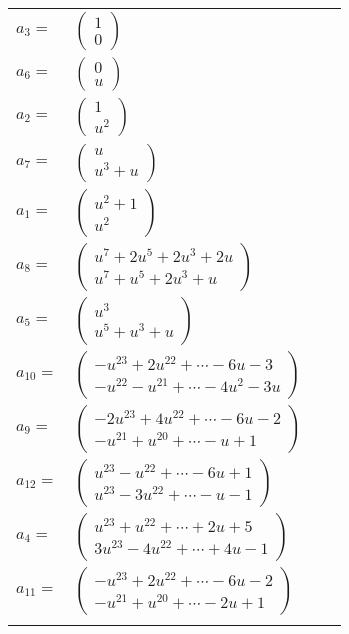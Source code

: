 \documentclass[1p]{elsarticle_modified}
\theoremstyle{definition}
\begin{document}
\begin{tabular}{m{7pt} m{180pt} m{7pt} m{180pt} }
\flushright $a_{3}=$&$\begin{pmatrix}1\\0\end{pmatrix}$ \\
\flushright $a_{6}=$&$\begin{pmatrix}0\\u\end{pmatrix}$ \\
\flushright $a_{2}=$&$\begin{pmatrix}1\\u^2\end{pmatrix}$ \\
\flushright $a_{7}=$&$\begin{pmatrix}u\\u^3+u\end{pmatrix}$ \\
\flushright $a_{1}=$&$\begin{pmatrix}u^2+1\\u^2\end{pmatrix}$ \\
\flushright $a_{8}=$&$\begin{pmatrix}u^7+2 u^5+2 u^3+2 u\\u^7+u^5+2 u^3+u\end{pmatrix}$ \\
\flushright $a_{5}=$&$\begin{pmatrix}u^3\\u^5+u^3+u\end{pmatrix}$ \\
\flushright $a_{10}=$&$\begin{pmatrix}- u^{23}+2 u^{22}+\cdots-6 u-3\\- u^{22}- u^{21}+\cdots-4 u^2-3 u\end{pmatrix}$ \\
\flushright $a_{9}=$&$\begin{pmatrix}-2 u^{23}+4 u^{22}+\cdots-6 u-2\\- u^{21}+u^{20}+\cdots- u+1\end{pmatrix}$ \\
\flushright $a_{12}=$&$\begin{pmatrix}u^{23}- u^{22}+\cdots-6 u+1\\u^{23}-3 u^{22}+\cdots- u-1\end{pmatrix}$ \\
\flushright $a_{4}=$&$\begin{pmatrix}u^{23}+u^{22}+\cdots+2 u+5\\3 u^{23}-4 u^{22}+\cdots+4 u-1\end{pmatrix}$ \\
\flushright $a_{11}=$&$\begin{pmatrix}- u^{23}+2 u^{22}+\cdots-6 u-2\\- u^{21}+u^{20}+\cdots-2 u+1\end{pmatrix}$\\&\end{tabular}
\end{document}
